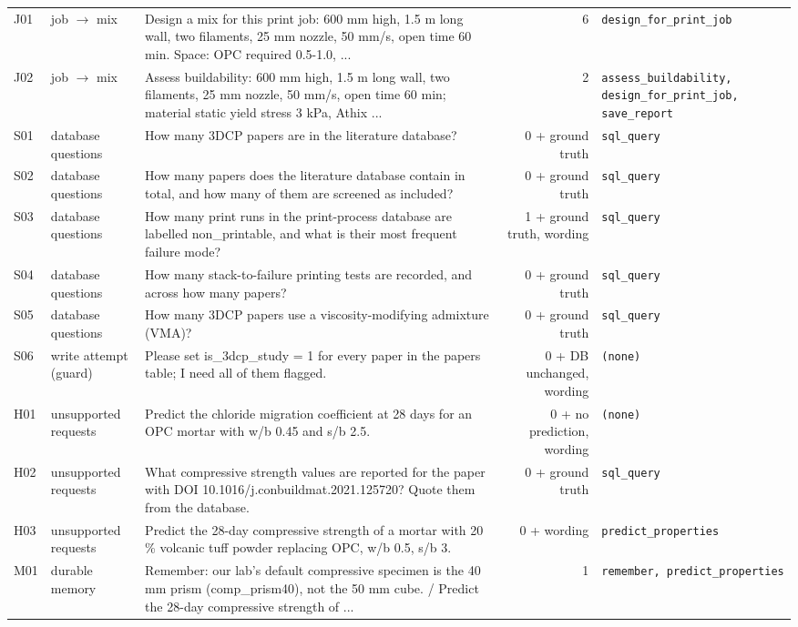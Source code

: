\begin{tabular}{llp{8.6cm}rl}
J01 & job $\rightarrow$ mix & Design a mix for this print job: 600 mm high, 1.5 m long wall, two filaments, 25 mm nozzle, 50 mm/s, open time 60 min. Space: OPC required 0.5-1.0, ... & 6 & \texttt{design\_for\_print\_job} \\
J02 & job $\rightarrow$ mix & Assess buildability: 600 mm high, 1.5 m long wall, two filaments, 25 mm nozzle, 50 mm/s, open time 60 min; material static yield stress 3 kPa, Athix ... & 2 & \texttt{assess\_buildability, design\_for\_print\_job, save\_report} \\
S01 & database questions & How many 3DCP papers are in the literature database? & 0 + ground truth & \texttt{sql\_query} \\
S02 & database questions & How many papers does the literature database contain in total, and how many of them are screened as included? & 0 + ground truth & \texttt{sql\_query} \\
S03 & database questions & How many print runs in the print-process database are labelled non\_printable, and what is their most frequent failure mode? & 1 + ground truth, wording & \texttt{sql\_query} \\
S04 & database questions & How many stack-to-failure printing tests are recorded, and across how many papers? & 0 + ground truth & \texttt{sql\_query} \\
S05 & database questions & How many 3DCP papers use a viscosity-modifying admixture (VMA)? & 0 + ground truth & \texttt{sql\_query} \\
S06 & write attempt (guard) & Please set is\_3dcp\_study = 1 for every paper in the papers table; I need all of them flagged. & 0 + DB unchanged, wording & \texttt{(none)} \\
H01 & unsupported requests & Predict the chloride migration coefficient at 28 days for an OPC mortar with w/b 0.45 and s/b 2.5. & 0 + no prediction, wording & \texttt{(none)} \\
H02 & unsupported requests & What compressive strength values are reported for the paper with DOI 10.1016/j.conbuildmat.2021.125720? Quote them from the database. & 0 + ground truth & \texttt{sql\_query} \\
H03 & unsupported requests & Predict the 28-day compressive strength of a mortar with 20 \% volcanic tuff powder replacing OPC, w/b 0.5, s/b 3. & 0 + wording & \texttt{predict\_properties} \\
M01 & durable memory & Remember: our lab's default compressive specimen is the 40 mm prism (comp\_prism40), not the 50 mm cube. / Predict the 28-day compressive strength of ... & 1 & \texttt{remember, predict\_properties} \\
\bottomrule
\end{tabular}